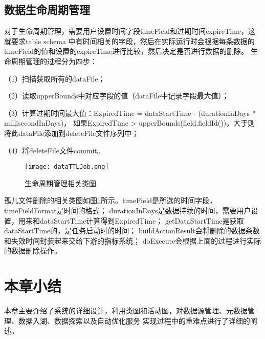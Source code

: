 \subsection{数据生命周期管理}

对于生命周期管理，需要用户设置时间字段timeField和过期时间expireTime，这就要求table schema
中有时间相关的字段，然后在实际运行时会根据每条数据的timeField的值和设置的expireTime进行比较，然后决定是否进行数据的删除。
生命周期管理的过程分为四步：

（1）扫描获取所有的dataFile；

（2）读取upperBounds中对应字段的值（dataFile中记录字段最大值）；

（3）计算过期时间最大值：ExpiredTime = dataStartTime - (durationInDays * millisecondInDays)，
如果ExpiredTime > upperBounds(field.fieldId())，大于则将此dataFile添加到deleteFile文件序列中；

（4）将deleteFile文件commit。

\begin{figure}[H]
  \centering
  \texttt{[image: dataTTLJob.png]}
  \caption{生命周期管理相关类图}
  \label{fig:dataTTLJob}
\end{figure}

孤儿文件删除的相关类图如图\ref{fig:dataTTLJob}所示。timeField是所选的时间字段，timeFieldFormat是时间的格式；
durationInDays是数据持续的时间，需要用户设置，用来和dataStartTime计算得到ExpiredTime；
getDataStartTime是获取dataStartTime的，是任务启动时的时间；
buildActionResult会将删除的数据条数和失效时间封装起来交给下游的指标系统；
doExecute会根据上面的过程进行实际的数据删除操作。

\section{本章小结}

本章主要介绍了系统的详细设计，利用类图和活动图，对数据源管理、元数据管理、数据入湖、数据探索以及自动优化服务
实现过程中的重难点进行了详细的阐述。
